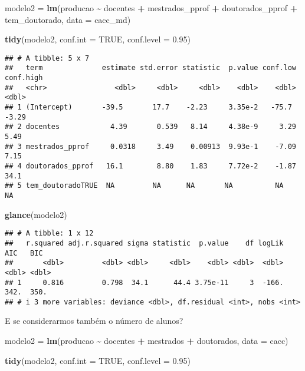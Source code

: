 \documentclass[
]{article}
\newenvironment{Shaded}{\begin{snugshade}}{\end{snugshade}}
\newcommand{\AttributeTok}[1]{\textcolor[rgb]{0.13,0.29,0.53}{#1}}
\newcommand{\ConstantTok}[1]{\textcolor[rgb]{0.56,0.35,0.01}{#1}}
\newcommand{\FloatTok}[1]{\textcolor[rgb]{0.00,0.00,0.81}{#1}}
\newcommand{\FunctionTok}[1]{\textcolor[rgb]{0.13,0.29,0.53}{\textbf{#1}}}
\newcommand{\NormalTok}[1]{#1}
\newcommand{\OtherTok}[1]{\textcolor[rgb]{0.56,0.35,0.01}{#1}}
\newcommand{\SpecialCharTok}[1]{\textcolor[rgb]{0.81,0.36,0.00}{\textbf{#1}}}
\begin{document}
\begin{Shaded}
\begin{Highlighting}[]
\NormalTok{modelo2 }\OtherTok{=} \FunctionTok{lm}\NormalTok{(producao }\SpecialCharTok{\textasciitilde{}}\NormalTok{ docentes }\SpecialCharTok{+}\NormalTok{ mestrados\_pprof }\SpecialCharTok{+}\NormalTok{ doutorados\_pprof }\SpecialCharTok{+}\NormalTok{ tem\_doutorado, }
             \AttributeTok{data =}\NormalTok{ cacc\_md)}

\FunctionTok{tidy}\NormalTok{(modelo2, }\AttributeTok{conf.int =} \ConstantTok{TRUE}\NormalTok{, }\AttributeTok{conf.level =} \FloatTok{0.95}\NormalTok{)}
\end{Highlighting}
\end{Shaded}

\begin{verbatim}
## # A tibble: 5 x 7
##   term              estimate std.error statistic  p.value conf.low conf.high
##   <chr>                <dbl>     <dbl>     <dbl>    <dbl>    <dbl>     <dbl>
## 1 (Intercept)       -39.5       17.7    -2.23     3.35e-2   -75.7      -3.29
## 2 docentes            4.39       0.539   8.14     4.38e-9     3.29      5.49
## 3 mestrados_pprof     0.0318     3.49    0.00913  9.93e-1    -7.09      7.15
## 4 doutorados_pprof   16.1        8.80    1.83     7.72e-2    -1.87     34.1 
## 5 tem_doutoradoTRUE  NA         NA      NA       NA          NA        NA
\end{verbatim}

\begin{Shaded}
\begin{Highlighting}[]
\FunctionTok{glance}\NormalTok{(modelo2)}
\end{Highlighting}
\end{Shaded}

\begin{verbatim}
## # A tibble: 1 x 12
##   r.squared adj.r.squared sigma statistic  p.value    df logLik   AIC   BIC
##       <dbl>         <dbl> <dbl>     <dbl>    <dbl> <dbl>  <dbl> <dbl> <dbl>
## 1     0.816         0.798  34.1      44.4 3.75e-11     3  -166.  342.  350.
## # i 3 more variables: deviance <dbl>, df.residual <int>, nobs <int>
\end{verbatim}

E se considerarmos também o número de alunos?

\begin{Shaded}
\begin{Highlighting}[]
\NormalTok{modelo2 }\OtherTok{=} \FunctionTok{lm}\NormalTok{(producao }\SpecialCharTok{\textasciitilde{}}\NormalTok{ docentes }\SpecialCharTok{+}\NormalTok{ mestrados }\SpecialCharTok{+}\NormalTok{ doutorados, }\AttributeTok{data =}\NormalTok{ cacc)}

\FunctionTok{tidy}\NormalTok{(modelo2, }\AttributeTok{conf.int =} \ConstantTok{TRUE}\NormalTok{, }\AttributeTok{conf.level =} \FloatTok{0.95}\NormalTok{)}
\end{Highlighting}
\end{Shaded}
\end{document}
